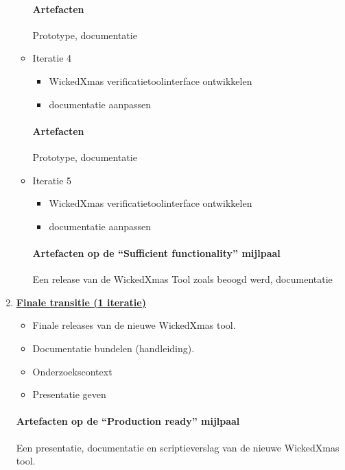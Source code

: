 \begin{enumerate}
\begin{itemize}
		\paragraph{Artefacten}
		Prototype, documentatie
	\item Iteratie 4
		\begin{itemize}
		\item WickedXmas verificatietoolinterface ontwikkelen
		\item documentatie aanpassen
		\end{itemize}
		\paragraph{Artefacten}
		Prototype, documentatie
	\item Iteratie 5
		\begin{itemize}
		\item WickedXmas verificatietoolinterface ontwikkelen
		\item documentatie aanpassen
		\end{itemize}
		\paragraph{Artefacten op de ``Sufficient functionality'' mijlpaal }
		 Een release van de WickedXmas Tool zoals beoogd werd,  documentatie
	\end{itemize}
\item \underline{\textbf{Finale transitie (1 iteratie)}}
	\begin{itemize}
		\item Finale releases van de nieuwe WickedXmas tool.
		\item Documentatie bundelen (handleiding).
		\item Onderzoekscontext
		\item Presentatie geven
	\end{itemize}
	\paragraph{Artefacten op de ``Production ready'' mijlpaal}
	Een presentatie, documentatie en scriptieverslag van de nieuwe WickedXmas tool.

\end{enumerate}